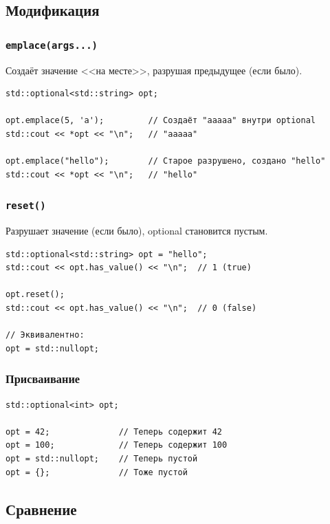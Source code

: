 \documentclass[a4paper,12pt]{article}
\begin{document}
\subsection{Модификация}

\subsubsection{\texttt{emplace(args...)}}

Создаёт значение <<на месте>>, разрушая предыдущее (если было).

\begin{lstlisting}
std::optional<std::string> opt;

opt.emplace(5, 'a');         // Создаёт "aaaaa" внутри optional
std::cout << *opt << "\n";   // "aaaaa"

opt.emplace("hello");        // Старое разрушено, создано "hello"
std::cout << *opt << "\n";   // "hello"
\end{lstlisting}

\subsubsection{\texttt{reset()}}

Разрушает значение (если было), optional становится пустым.

\begin{lstlisting}
std::optional<std::string> opt = "hello";
std::cout << opt.has_value() << "\n";  // 1 (true)

opt.reset();
std::cout << opt.has_value() << "\n";  // 0 (false)

// Эквивалентно:
opt = std::nullopt;
\end{lstlisting}

\subsubsection{Присваивание}

\begin{lstlisting}
std::optional<int> opt;

opt = 42;              // Теперь содержит 42
opt = 100;             // Теперь содержит 100
opt = std::nullopt;    // Теперь пустой
opt = {};              // Тоже пустой
\end{lstlisting}

\subsection{Сравнение}
\end{document}
